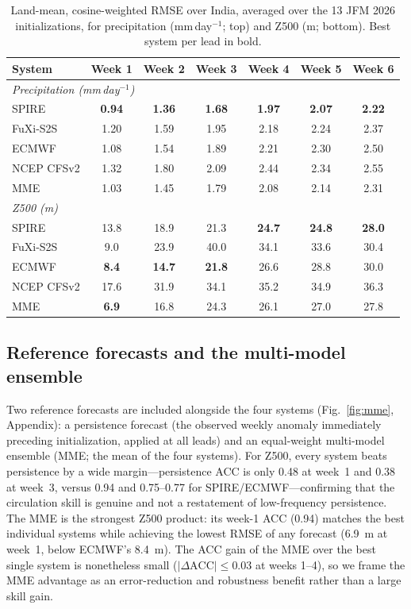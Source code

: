 \documentclass[11pt,a4paper]{article}
\begin{document}
\begin{table}[t]
  \centering
  \small
  \caption{Land-mean, cosine-weighted RMSE over India, averaged over the
  13 JFM 2026 initializations, for precipitation (mm\,day$^{-1}$; top)
  and Z500 (m; bottom). Best system per lead in bold.}
  \label{tab:rmse}
  \setlength{\tabcolsep}{5pt}
  \begin{tabular}{lcccccc}
    \toprule
    System & Week 1 & Week 2 & Week 3 & Week 4 & Week 5 & Week 6 \\
    \midrule
    \multicolumn{7}{l}{\emph{Precipitation (mm\,day$^{-1}$)}}\\
    SPIRE        & \textbf{0.94} & \textbf{1.36} & \textbf{1.68} & \textbf{1.97} & \textbf{2.07} & \textbf{2.22} \\
    FuXi-S2S     & 1.20 & 1.59 & 1.95 & 2.18 & 2.24 & 2.37 \\
    ECMWF        & 1.08 & 1.54 & 1.89 & 2.21 & 2.30 & 2.50 \\
    NCEP CFSv2   & 1.32 & 1.80 & 2.09 & 2.44 & 2.34 & 2.55 \\
    MME          & 1.03 & 1.45 & 1.79 & 2.08 & 2.14 & 2.31 \\
    \midrule
    \multicolumn{7}{l}{\emph{Z500 (m)}}\\
    SPIRE        & 13.8 & 18.9 & 21.3 & \textbf{24.7} & \textbf{24.8} & \textbf{28.0} \\
    FuXi-S2S     &  9.0 & 23.9 & 40.0 & 34.1          & 33.6          & 30.4 \\
    ECMWF        & \textbf{8.4} & \textbf{14.7} & \textbf{21.8} & 26.6 & 28.8 & 30.0 \\
    NCEP CFSv2   & 17.6 & 31.9 & 34.1 & 35.2          & 34.9          & 36.3 \\
    MME          & \textbf{6.9} & 16.8 & 24.3 & 26.1 & 27.0 & 27.8 \\
    \bottomrule
  \end{tabular}
\end{table}

\subsection{Reference forecasts and the multi-model ensemble}
\label{sec:mme}

Two reference forecasts are included alongside the four systems
(Fig.~\ref{fig:mme}, Appendix): a persistence forecast (the observed
weekly anomaly immediately preceding initialization, applied at all
leads) and an equal-weight multi-model ensemble (MME; the mean of the
four systems). For Z500, every system beats persistence by a wide
margin---persistence ACC is only 0.48 at week~1 and 0.38 at week~3,
versus 0.94 and 0.75--0.77 for SPIRE/ECMWF---confirming that the
circulation skill is genuine and not a restatement of low-frequency
persistence. The MME is the strongest
Z500 product: its week-1 ACC (0.94) matches the best individual systems
while achieving the lowest RMSE of any forecast (6.9~m at week~1, below
ECMWF's 8.4~m). The ACC gain of the MME over the best single system
is nonetheless small ($|\Delta\mathrm{ACC}|\leq0.03$ at weeks 1--4), so
we frame the MME advantage as an error-reduction and robustness benefit
rather than a large skill gain.
\end{document}
